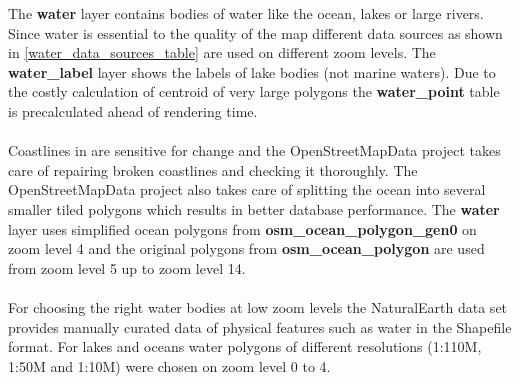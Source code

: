 \noindent\begin{minipage}[t]{0.48\linewidth}
    \vspace{0pt}
    The \textbf{water} layer contains bodies of water like the ocean, lakes or large rivers.
    Since water is essential to the quality of the map different data sources as shown in \autoref{water_data_sources_table} are used on different zoom levels. 
    The \textbf{water\_label} layer shows the labels of lake bodies (not marine waters). Due to the costly calculation of centroid of very large polygons the \textbf{water\_point} table is precalculated ahead of rendering time.
    \\\\
    Coastlines in \osm{} are sensitive for change and
    the OpenStreetMapData\cite{14_openstreetmapdata.com_2015}
    project takes care of repairing broken coastlines and checking it thoroughly. The OpenStreetMapData project also takes care of splitting the ocean into several smaller tiled polygons which results in better database performance.
    The \textbf{water} layer uses simplified ocean polygons from \textbf{osm\_ocean\_polygon\_gen0} on zoom level 4 and the original polygons from \textbf{osm\_ocean\_polygon} are used from zoom level 5 up to zoom level 14.
    \\\\
    For choosing the right water bodies at low zoom levels the NaturalEarth data set \cite{16_naturalearthdata.com_2015} provides manually curated data of physical features such as water in the Shapefile format. For lakes and oceans water polygons of different resolutions (1:110M, 1:50M and 1:10M) were chosen on zoom level 0 to 4.
\end{minipage}
\hfill
